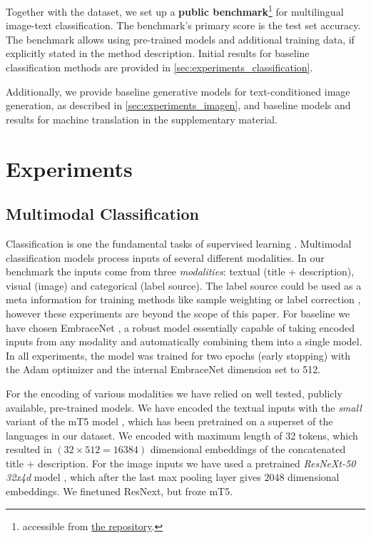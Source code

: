 \documentclass{bmvc2k}
\begin{document}
Together with the dataset, we set up a \textbf{public benchmark}\footnote{\label{note:leaderboard}accessible from \href{https://github.com/glami/glami-1m}{the repository}.} for multilingual image-text  classification. The benchmark's primary score is the test set accuracy. The benchmark allows using pre-trained models and additional training data, if explicitly stated in the method description. Initial results for baseline classification methods are provided in \autoref{sec:experiments_classification}.

Additionally, we provide baseline generative models for text-conditioned image generation, as described in \autoref{sec:experiments_imagen}, and baseline models and results for machine translation in the supplementary material.



\section{Experiments}
\label{sec:experiments}



\subsection{Multimodal Classification}
\label{sec:experiments_classification}
Classification is one the fundamental tasks of supervised learning \cite{sen2020supervised}. Multimodal classification models process inputs of several different modalities. In our benchmark the inputs come from three \emph{modalities}: textual (title + description), visual (image) and categorical (label source). The label source could be used as a meta information for training methods like sample weighting \cite{metaWeightNetLA} or label correction \cite{metaLabelCorrection}, however these experiments are beyond the scope of this paper. For baseline we have chosen EmbraceNet \cite{embracenet}, a robust model essentially capable of taking encoded inputs from any modality and automatically combining them into a single model. In all experiments, the model was trained for two epochs (early stopping) with the Adam optimizer and the internal EmbraceNet dimension set to 512. 

For the encoding of various modalities we have relied on well tested, publicly available, pre-trained models. We have encoded the textual inputs with the \emph{small} variant of the mT5 model \cite{xue-etal-2021-mt5}, which has been pretrained on a superset of the languages in our dataset. We encoded with maximum length of 32 tokens, which resulted in $(32 \times 512 = 16384)$ dimensional embeddings of the concatenated title + description. For the image inputs we have used a pretrained \emph{ResNeXt-50 32x4d} model \cite{resnext}, which after the last max pooling layer gives $2048$ dimensional embeddings. We finetuned ResNext, but froze mT5.
\end{document}
